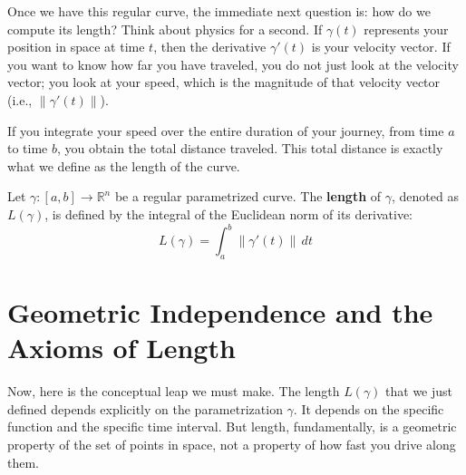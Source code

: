 \begin{spokenclean}[00:06:10 - 00:07:05]
Once we have this regular curve, the immediate next question is: how do we compute its length? Think about physics for a second. If $\gamma(t)$ represents your position in space at time $t$, then the derivative $\gamma'(t)$ is your velocity vector. If you want to know how far you have traveled, you do not just look at the velocity vector; you look at your speed, which is the magnitude of that velocity vector (i.e., $\|\gamma'(t)\|$).
\end{spokenclean}

\begin{spokenclean}[00:07:05 - 00:07:15]
If you integrate your speed over the entire duration of your journey, from time $a$ to time $b$, you obtain the total distance traveled. This total distance is exactly what we define as the length of the curve.
\end{spokenclean}

\begin{orangeformula}
\begin{definition}
Let $\gamma: [a, b] \to \mathbb{R}^n$ be a regular parametrized curve. The \textbf{length} of $\gamma$, denoted as $L(\gamma)$, is defined by the integral of the Euclidean norm of its derivative:
\begin{equation} \label{eq:arc_length}
L(\gamma) = \int_a^b \|\gamma'(t)\| \, dt
\end{equation}
\end{definition}
\end{orangeformula}


\section{Geometric Independence and the Axioms of Length}

\begin{spokenclean}[00:07:15 - 00:08:30]
Now, here is the conceptual leap we must make. The length $L(\gamma)$ that we just defined depends explicitly on the parametrization $\gamma$. It depends on the specific function and the specific time interval. But length, fundamentally, is a geometric property of the set of points in space, not a property of how fast you drive along them. 
\end{spokenclean}

